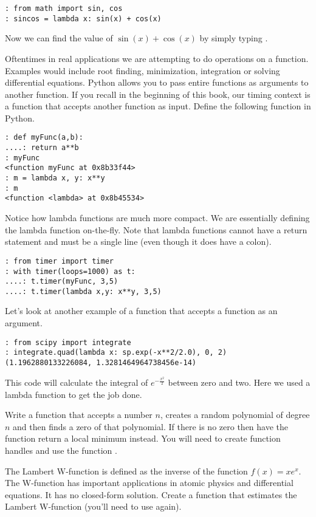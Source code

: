 \begin{lstlisting}
: from math import sin, cos
: sincos = lambda x: sin(x) + cos(x)
\end{lstlisting}

Now we can find the value of $\sin(x) + \cos(x)$ by simply typing .

Oftentimes in real applications we are attempting to do operations on a function. Examples would include root finding, minimization, integration or solving differential equations. Python allows you to pass entire functions as arguments to another function.  If you recall in the beginning of this book, our timing context is a function that accepts another function as input.  Define the following function in Python.
\begin{lstlisting}
: def myFunc(a,b):
....: return a**b
: myFunc
<function myFunc at 0x8b33f44>
: m = lambda x, y: x**y
: m
<function <lambda> at 0x8b45534>
\end{lstlisting}

Notice how lambda functions are much more compact. We are essentially defining the lambda function on-the-fly.  Note that lambda functions cannot have a return statement and must be a single line (even though it does have a colon).
\begin{lstlisting}
: from timer import timer
: with timer(loops=1000) as t:
....: t.timer(myFunc, 3,5)
....: t.timer(lambda x,y: x**y, 3,5)
\end{lstlisting}

Let's look at another example of a function that accepts a function as an argument.
\begin{lstlisting}
: from scipy import integrate
: integrate.quad(lambda x: sp.exp(-x**2/2.0), 0, 2)
(1.1962880133226084, 1.3281464964738456e-14)
\end{lstlisting}

This code will calculate the integral of $e^{-\frac{x^2}{2}}$ between zero and two. Here we used a lambda function to get the job done. 

\begin{problem}
Write a function that accepts a number $n$, creates a random polynomial of degree $n$ and then finds a zero of that polynomial. If there is no zero then have the function return a local minimum instead. You will need to create function handles and use the function .
\end{problem}

\begin{problem}
The Lambert W-function is defined as the inverse of the function $f(x) = xe^x$. The W-function has important applications in atomic physics and differential equations. It has no closed-form solution. Create a function that estimates the Lambert W-function (you'll need to use  again).
\end{problem}

